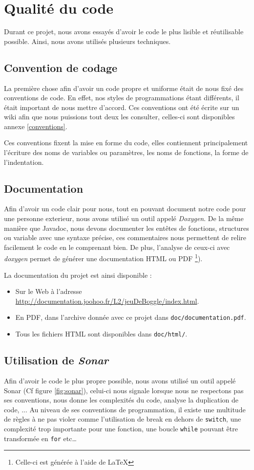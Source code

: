 \documentclass[12pt,a4paper,openany]{book}
\begin{document}
	\chapter{Qualité du code}
		Durant ce projet, nous avons essayés d'avoir le code le plus lisible et réutilisable possible. Ainsi, nous avons utilisés
		plusieurs techniques.
		\section{Convention de codage}
		La première chose afin d'avoir un code propre et uniforme était de nous fixé des conventions de code. En effet, nos styles
		de programmations étant différents, il était important de nous mettre d'accord. Ces conventions ont été écrite sur un wiki
		afin que nous puissions tout deux les consulter, celles-ci sont disponibles annexe \ref{conventions}. 

		Ces conventions fixent la mise en forme du code, elles contiennent principalement l'écriture des noms de variables ou paramètres, 
		les noms de fonctions, la forme de l'indentation.
		\section{Documentation}
		Afin d'avoir un code clair pour nous, tout en pouvant document notre code pour une personne exterieur, nous avons utilisé un
		outil appelé \textit{Doxygen}. De la même manière que Javadoc, nous devons documenter les entêtes de fonctions, structures
		ou variable avec une syntaxe précise, ces commentaires nous permettent de relire facilement le code en le comprenant bien.
		De plus, l'analyse de ceux-ci avec \textit{doxygen} permet de générer une documentation HTML ou PDF \footnote{Celle-ci est générée à l'aide de \LaTeX}).

		La documentation du projet est ainsi disponible :
		\begin{itemize}
			\item Sur le Web à l'adresse \url{http://documentation.joohoo.fr/L2/jeuDeBoggle/index.html}.
			\item En PDF, dans l'archive donnée avec ce projet dans \texttt{doc/documentation.pdf}.
			\item Tous les fichiers HTML sont disponibles dans \texttt{doc/html/}. 
		\end{itemize}
		\section{Utilisation de \textit{Sonar}}
		Afin d'avoir le code le plus propre possible, nous avons utilisé un outil appelé Sonar (Cf figure \ref{fig:sonar}), celui-ci
		nous signale lorsque nous ne respectons pas ses conventions, nous donne les complexités du code, analyse la duplication de
		code, ... 
		Au niveau de ses conventions de programmation, il existe une multitude de règles à ne pas violer comme l'utilisation de
		break en dehors de \texttt{switch}, une complexité trop importante pour une fonction, une boucle \texttt{while} pouvant être transformée en \texttt{for} etc\ldots 
\end{document}
